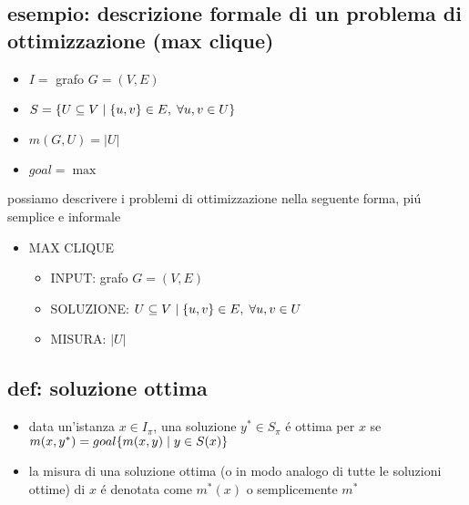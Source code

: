 
\subsection*{esempio: descrizione formale di un problema di ottimizzazione (max clique)}
\begin{flushleft}
	\begin{itemize}
		\item $I=$ grafo $G=(V,E)$
		\item $S= \{U\subseteq V\hspace{0.1cm}\vert\hspace{0.1cm}\{u,v\}\in E,\hspace{0.1cm}\forall u,v\in U\}$
		\item $m(G,U)=|U|$
		\item $goal=\max$
	\end{itemize}
	\vspace{0.5cm}
	possiamo descrivere i problemi di ottimizzazione nella seguente forma, pi\'u semplice e informale
	\begin{itemize}
		\item MAX CLIQUE
		\begin{itemize}
			\item INPUT: grafo $G=(V,E)$
			\item SOLUZIONE: $U\subseteq V\hspace{0.1cm}\vert\hspace{0.1cm}\{u,v\}\in E,\hspace{0.1cm}\forall u,v\in U$
			\item MISURA: $|U|$
		\end{itemize}
	\end{itemize}
\end{flushleft}


\subsection*{def: soluzione ottima}
\begin{flushleft}
	\begin{itemize}
		\item data un'istanza $x\in I_\pi$, una soluzione $y^*\in S_\pi$ \'e ottima per $x$ se $m(x,y^*)=goal\{m(x,y)\hspace{0.1cm}\vert\hspace{0.1cm}y\in S(x)\}$
	\item la misura di una soluzione ottima (o in modo analogo di tutte le soluzioni ottime) di $x$ \'e denotata come $m^*(x)$ o semplicemente $m^*$
	\end{itemize}
\end{flushleft}

